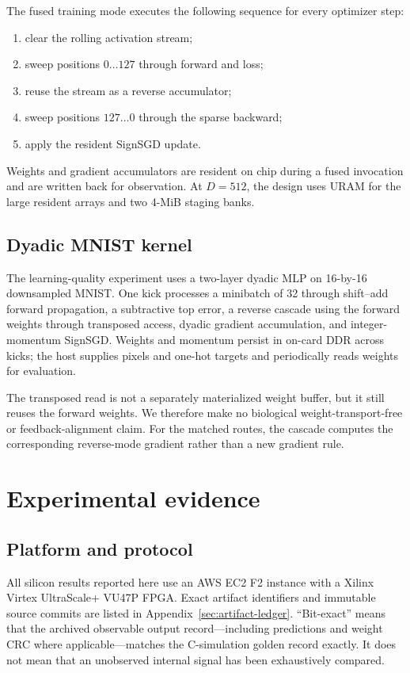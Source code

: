 \documentclass[10pt]{article}
\begin{document}
The fused training mode executes the following sequence for every optimizer
step:
\begin{enumerate}
  \item clear the rolling activation stream;
  \item sweep positions $0\ldots127$ through forward and loss;
  \item reuse the stream as a reverse accumulator;
  \item sweep positions $127\ldots0$ through the sparse backward;
  \item apply the resident SignSGD update.
\end{enumerate}
Weights and gradient accumulators are resident on chip during a fused
invocation and are written back for observation.  At $D=512$, the design uses
URAM for the large resident arrays and two 4-MiB staging banks.

\subsection{Dyadic MNIST kernel}

The learning-quality experiment uses a two-layer dyadic MLP on 16-by-16
downsampled MNIST.  One kick processes a minibatch of 32 through shift--add
forward propagation, a subtractive top error, a reverse cascade using the
forward weights through transposed access, dyadic gradient accumulation, and
integer-momentum SignSGD.  Weights and momentum persist in on-card DDR across
kicks; the host supplies pixels and one-hot targets and periodically reads
weights for evaluation.

The transposed read is not a separately materialized weight buffer, but it
still reuses the forward weights.  We therefore make no biological
weight-transport-free or feedback-alignment claim.  For the matched routes,
the cascade computes the corresponding reverse-mode gradient rather than a
new gradient rule.

\section{Experimental evidence}

\subsection{Platform and protocol}

All silicon results reported here use an AWS EC2 F2 instance with a Xilinx
Virtex UltraScale+ VU47P FPGA.  Exact artifact identifiers and immutable source
commits are listed in Appendix~\ref{sec:artifact-ledger}.  ``Bit-exact'' means
that the archived observable output record---including predictions and weight
CRC where applicable---matches the C-simulation golden record exactly.  It
does not mean that an unobserved internal signal has been exhaustively compared.
\end{document}
